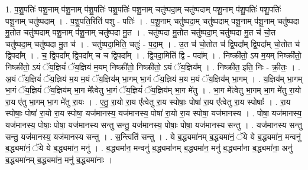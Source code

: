 \documentclass[17pt]{extarticle}
\begin{document}
1. प॒शु॒पतिः॑ पशू॒नाम् प॑शू॒नाम् प॑शु॒पतिः॑ पशु॒पतिः॑ पशू॒नाम् चतु॑ष्पदा॒म् चतु॑ष्पदाम् पशू॒नाम् प॑शु॒पतिः॑ पशु॒पतिः॑ पशू॒नाम् चतु॑ष्पदाम् । . प॒शु॒पति॒रिति॑ पशु - पतिः॑ । . प॒शू॒नाम् चतु॑ष्पदा॒म् चतु॑ष्पदाम् पशू॒नाम् प॑शू॒नाम् चतु॑ष्पदा मु॒तोत चतु॑ष्पदाम् पशू॒नाम् प॑शू॒नाम् चतु॑ष्पदा मु॒त । . चतु॑ष्पदा मु॒तोत चतु॑ष्पदा॒म् चतु॑ष्पदा मु॒त च॑ चो॒त चतु॑ष्पदा॒म् चतु॑ष्पदा मु॒त च॑ । . चतु॑ष्पदा॒मिति॒ चतुः॑ - प॒दा॒म् । . उ॒त च॑ चो॒तोत च॑ द्वि॒पदा᳚म् द्वि॒पदा᳚म् चो॒तोत च॑ द्वि॒पदा᳚म् । . च॒ द्वि॒पदा᳚म् द्वि॒पदा᳚म् च च द्वि॒पदा᳚म् । . द्वि॒पदा॒मिति॑ द्वि - पदा᳚म् । . निष्क्री॑तो॒ ऽय म॒यम् निष्क्री॑तो॒ निष्क्री॑तो॒ ऽयं ॅय॒ज्ञियं॑ ॅय॒ज्ञिय॑ म॒यम् निष्क्री॑तो॒ निष्क्री॑तो॒ ऽयं ॅय॒ज्ञिय᳚म् । . निष्क्री॑त॒ इति॒ निः - क्री॒तः॒ । . अ॒यं ॅय॒ज्ञियं॑ ॅय॒ज्ञिय॑ म॒य म॒यं ॅय॒ज्ञिय॑म् भा॒गम् भा॒गं ॅय॒ज्ञिय॑ म॒य म॒यं ॅय॒ज्ञिय॑म् भा॒गम् । . य॒ज्ञिय॑म् भा॒गम् भा॒गं ॅय॒ज्ञियं॑ ॅय॒ज्ञिय॑म् भा॒ग मे᳚त्वेतु भा॒गं ॅय॒ज्ञियं॑ ॅय॒ज्ञिय॑म् भा॒ग मे॑तु । . भा॒ग मे᳚त्वेतु भा॒गम् भा॒ग मे॑तु रा॒यो रा॒य ए॑तु भा॒गम् भा॒ग मे॑तु रा॒यः । . ए॒तु॒ रा॒यो रा॒य ए᳚त्वेतु रा॒य स्पोषाः॒ पोषा॑ रा॒य ए᳚त्वेतु रा॒य स्पोषाः᳚ । . रा॒य स्पोषाः॒ पोषा॑ रा॒यो रा॒य स्पोषा॒ यज॑मानस्य॒ यज॑मानस्य॒ पोषा॑ रा॒यो रा॒य स्पोषा॒ यज॑मानस्य । . पोषा॒ यज॑मानस्य॒ यज॑मानस्य॒ पोषाः॒ पोषा॒ यज॑मानस्य सन्तु सन्तु॒ यज॑मानस्य॒ पोषाः॒ पोषा॒ यज॑मानस्य सन्तु । . यज॑मानस्य सन्तु सन्तु॒ यज॑मानस्य॒ यज॑मानस्य सन्तु । . स॒न्त्विति॑ सन्तु । . ये ब॒द्ध्यमा॑नम् ब॒द्ध्यमा॑नं॒ ॅये ये ब॒द्ध्यमा॑न॒ मन्वनु॑ ब॒द्ध्यमा॑नं॒ ॅये ये ब॒द्ध्यमा॑न॒ मनु॑ । . ब॒द्ध्यमा॑न॒ मन्वनु॑ ब॒द्ध्यमा॑नम् ब॒द्ध्यमा॑न॒ मनु॑ ब॒द्ध्यमा॑ना ब॒द्ध्यमा॑ना॒ अनु॑ ब॒द्ध्यमा॑नम् ब॒द्ध्यमा॑न॒ मनु॑ ब॒द्ध्यमा॑नाः । \newline
\end{document}
